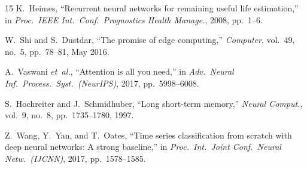 \documentclass[conference]{IEEEtran}
\begin{document}
\begin{thebibliography}{15}
K.~Heimes,
``Recurrent neural networks for remaining useful life estimation,''
in \textit{Proc.\ IEEE Int.\ Conf.\ Prognostics Health Manage.},
2008, pp.~1--6.

W.~Shi and S.~Dustdar,
``The promise of edge computing,''
\textit{Computer},
vol.~49, no.~5, pp.~78--81, May 2016.

A.~Vaswani \textit{et~al.},
``Attention is all you need,''
in \textit{Adv.\ Neural Inf.\ Process.\ Syst.\ (NeurIPS)},
2017, pp.~5998--6008.

S.~Hochreiter and J.~Schmidhuber,
``Long short-term memory,''
\textit{Neural Comput.},
vol.~9, no.~8, pp.~1735--1780, 1997.

Z.~Wang, Y.~Yan, and T.~Oates,
``Time series classification from scratch with deep neural networks:
A strong baseline,''
in \textit{Proc.\ Int.\ Joint Conf.\ Neural Netw.\ (IJCNN)},
2017, pp.~1578--1585.

\end{thebibliography}
\end{document}
